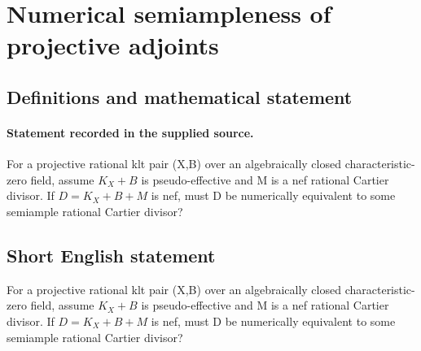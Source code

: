 \documentclass[11pt]{article}
\begin{document}
\section*{Numerical semiampleness of projective adjoints}\label{30007057}
\subsection{Definitions and mathematical statement}
\paragraph{Statement recorded in the supplied source.}
For a projective rational klt pair (X,B) over an algebraically closed characteristic-zero field, assume $K_X+B$ is pseudo-effective and M is a nef rational Cartier divisor. If $D=K_X+B+M$ is nef, must D be numerically equivalent to some semiample rational Cartier divisor?
\subsection{Short English statement}
For a projective rational klt pair (X,B) over an algebraically closed characteristic-zero field, assume $K_X+B$ is pseudo-effective and M is a nef rational Cartier divisor. If $D=K_X+B+M$ is nef, must D be numerically equivalent to some semiample rational Cartier divisor?
\end{document}
